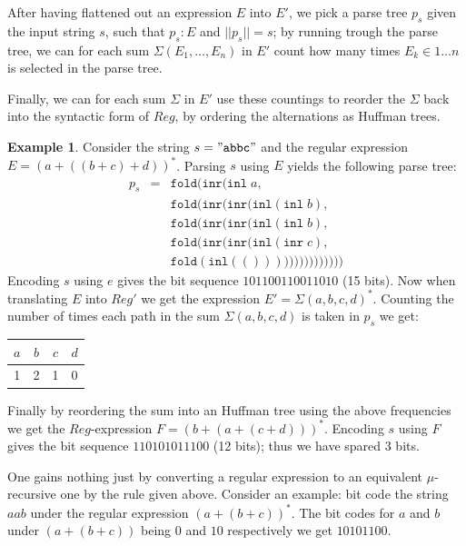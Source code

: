 \documentclass[a4paper, oneside]{memoir}
\theoremstyle{definition}
\newtheorem{example}{Example}
\begin{document}
After having flattened out an expression $E$ into $E'$, we pick a parse tree $p_s$ given the input string $s$, such that $p_s : E$ and $||p_s|| = s$; by running trough the parse tree, we can for each sum $\Sigma(E_1, \dots, E_n)$ in $E'$ count how many times $E_k \in 1 \dots n$ is selected in the parse tree.

Finally, we can for each sum $\Sigma$ in $E'$ use these countings to reorder the $\Sigma$ back into the syntactic form of $Reg$, by ordering the alternations as Huffman trees.

\begin{example}
Consider the string $s = \mathtt{"abbc"}$ and the regular expression $E = (a + ((b + c) + d))^{*}$. Parsing $s$ using $E$ yields the following parse tree:
\[
\begin{array}{rcl}
p_s & = & \mathtt{fold}(\mathtt{inr}(\mathtt{inl} \; a, \\
    &   & \mathtt{fold}(\mathtt{inr}(\mathtt{inr}(\mathtt{inl}(\mathtt{inl} \; b), \\
    &   & \mathtt{fold}(\mathtt{inr}(\mathtt{inr}(\mathtt{inl}(\mathtt{inl} \; b), \\
    &   & \mathtt{fold}(\mathtt{inr}(\mathtt{inr}(\mathtt{inl}(\mathtt{inr} \; c), \\
    &   & \mathtt{fold}(\mathtt{inl}(()))))))))))))))
\end{array}
\]
\noindent Encoding $s$ using $e$ gives the bit sequence $101100110011010$ (15 bits). Now when translating $E$ into $Reg'$ we get the expression $E' = \Sigma{(a, b, c, d)}^{*}$. Counting the number of times each path in the sum $\Sigma{(a, b, c, d)}$ is taken in $p_s$ we get:

\begin{center}
\begin{tabular}{c|c|c|c}
$a$ & $b$ & $c$ & $d$ \\
\hline
1   & 2   & 1   & 0
\end{tabular}
\end{center}

\noindent Finally by reordering the sum into an Huffman tree using the above frequencies we get the $Reg$-expression $F = (b + (a + (c + d)))^{*}$. Encoding $s$ using $F$ gives the bit sequence $110101011100$ (12 bits); thus we have spared 3 bits.

\end{example}

One gains nothing just by converting a regular expression to an equivalent
$\mu$-recursive one by the rule given above. Consider an example: bit code the
string $aab$ under the regular expression $(a + (b + c))^{\ast}$. The bit codes
for $a$ and $b$ under $(a + (b + c))$ being $0$ and $10$ respectively we get
$10101100$.
\end{document}
